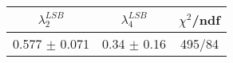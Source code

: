 \begin{tabular}{c|c||c}
$\lambda_{2}^{LSB}$ & $\lambda_4^{LSB}$ & $\chi^{2}$/ndf \\
\hline
0.577 $\pm$ 0.071 & 0.34 $\pm$ 0.16 & 495/84\\
\end{tabular}

